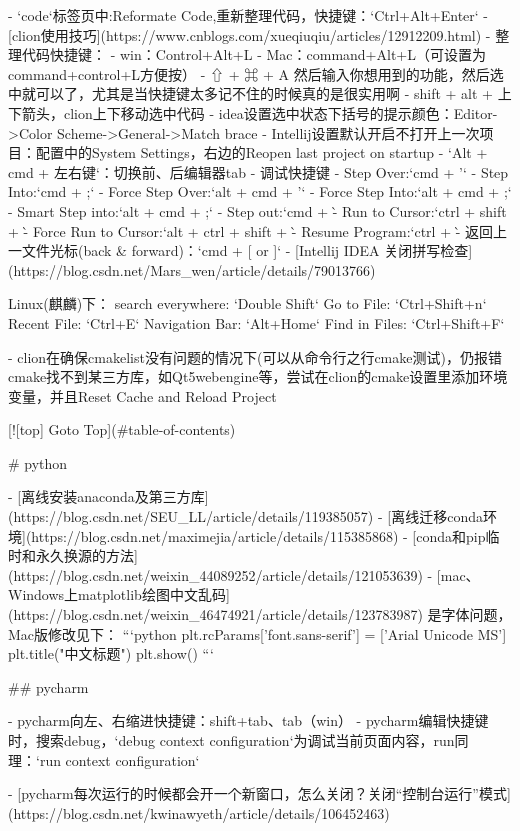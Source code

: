 - `code`标签页中:Reformate Code,重新整理代码，快捷键：`Ctrl+Alt+Enter`
- [clion使用技巧](https://www.cnblogs.com/xueqiuqiu/articles/12912209.html)
- 整理代码快捷键：
    - win：Control+Alt+L
    - Mac：command+Alt+L（可设置为command+control+L方便按）
- ⇧ + ⌘ + A 然后输入你想用到的功能，然后选中就可以了，尤其是当快捷键太多记不住的时候真的是很实用啊
- shift + alt + 上下箭头，clion上下移动选中代码
- idea设置选中状态下括号的提示颜色：Editor->Color Scheme->General->Match brace
- Intellij设置默认开启不打开上一次项目：配置中的System Settings，右边的Reopen last project on startup
- `Alt + cmd + 左右键`：切换前、后编辑器tab
- 调试快捷键
  - Step Over:`cmd + '`
  - Step Into:`cmd + ;`
  - Force Step Over:`alt + cmd + '`
  - Force Step Into:`alt + cmd + ;`
  - Smart Step into:`alt + cmd + ;`
  - Step out:`cmd + \`
  - Run to Cursor:`ctrl + shift + \`
  - Force Run to Cursor:`alt + ctrl + shift + \`
  - Resume Program:`ctrl + \`
- 返回上一文件光标(back & forward)：`cmd + [ or ]`
- [Intellij IDEA 关闭拼写检查](https://blog.csdn.net/Mars_wen/article/details/79013766)

Linux(麒麟)下：
search everywhere: `Double Shift`
Go to File: `Ctrl+Shift+n`
Recent File: `Ctrl+E`
Navigation Bar: `Alt+Home`
Find in Files: `Ctrl+Shift+F`

- clion在确保cmakelist没有问题的情况下(可以从命令行之行cmake测试)，仍报错cmake找不到某三方库，如Qt5webengine等，尝试在clion的cmake设置里添加环境变量，并且Reset Cache and Reload Project


[![top] Goto Top](#table-of-contents)

# python

- [离线安装anaconda及第三方库](https://blog.csdn.net/SEU_LL/article/details/119385057)
- [离线迁移conda环境](https://blog.csdn.net/maximejia/article/details/115385868)
- [conda和pip临时和永久换源的方法](https://blog.csdn.net/weixin_44089252/article/details/121053639)
- [mac、Windows上matplotlib绘图中文乱码](https://blog.csdn.net/weixin_46474921/article/details/123783987)
  是字体问题，Mac版修改见下：
  ```python
    plt.rcParams['font.sans-serif'] = ['Arial Unicode MS']
    plt.title("中文标题")
    plt.show()
  ```

## pycharm

- pycharm向左、右缩进快捷键：shift+tab、tab（win）
- pycharm编辑快捷键时，搜索debug，`debug context configuration`为调试当前页面内容，run同理：`run context configuration`

- [pycharm每次运行的时候都会开一个新窗口，怎么关闭？关闭“控制台运行”模式](https://blog.csdn.net/kwinawyeth/article/details/106452463)

